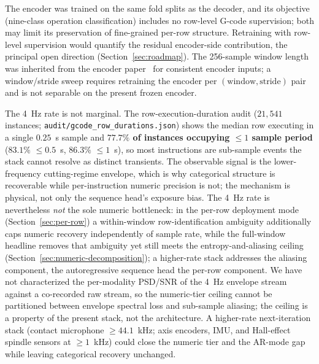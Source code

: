 \documentclass[sensors,article,submit,moreauthors,pdftex]{Definitions/mdpi}
\begin{document}
The encoder was trained on the same fold splits as the decoder, and its objective (nine-class operation classification) includes no row-level G-code supervision; both may limit its preservation of fine-grained per-row structure. Retraining with row-level supervision would quantify the residual encoder-side contribution, the principal open direction (Section~\ref{sec:roadmap}). The 256-sample window length was inherited from the encoder paper~\cite{encoder_paper} for consistent encoder inputs; a window/stride sweep requires retraining the encoder per $(\text{window}, \text{stride})$ pair and is not separable on the present frozen encoder.

The 4~Hz rate is not marginal. The row-execution-duration audit ($21{,}541$ instances; \texttt{audit/gcode\_row\_durations.json}) shows the median row executing in a single $0.25$~s sample and \textbf{$77.7\%$ of instances occupying $\le\!1$ sample period} ($83.1\%$ $\le\!0.5$~s, $86.3\%$ $\le\!1$~s), so most instructions are sub-sample events the stack cannot resolve as distinct transients. The observable signal is the lower-frequency cutting-regime envelope, which is why categorical structure is recoverable while per-instruction numeric precision is not; the mechanism is physical, not only the sequence head's exposure bias. The 4~Hz rate is nevertheless \emph{not} the sole numeric bottleneck: in the per-row deployment mode (Section~\ref{sec:per-row}) a within-window row-identification ambiguity additionally caps numeric recovery independently of sample rate, while the full-window headline removes that ambiguity yet still meets the entropy-and-aliasing ceiling (Section~\ref{sec:numeric-decomposition}); a higher-rate stack addresses the aliasing component, the autoregressive sequence head the per-row component. We have not characterized the per-modality PSD/SNR of the 4~Hz envelope stream against a co-recorded raw stream, so the numeric-tier ceiling cannot be partitioned between envelope spectral loss and sub-sample aliasing; the ceiling is a property of the present stack, not the architecture. A higher-rate next-iteration stack (contact microphone $\geq 44.1$~kHz; axis encoders, IMU, and Hall-effect spindle sensors at $\geq 1$~kHz) could close the numeric tier and the AR-mode gap while leaving categorical recovery unchanged.
\end{document}
